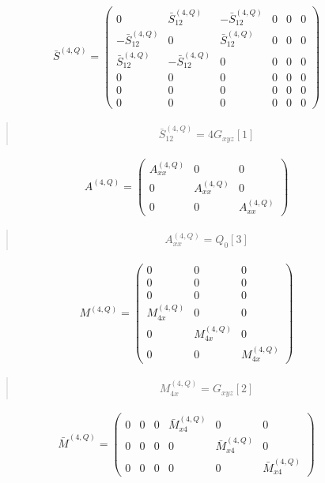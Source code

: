 \documentclass[fleqn,10pt]{jsarticle}
\begin{document}
\begin{align*}
\bar{S}^{(4,Q)} = \begin{pmatrix} 0 & \bar{S}^{(4,Q)}_{12} & - \bar{S}^{(4,Q)}_{12} & 0 & 0 & 0 \\ - \bar{S}^{(4,Q)}_{12} & 0 & \bar{S}^{(4,Q)}_{12} & 0 & 0 & 0 \\ \bar{S}^{(4,Q)}_{12} & - \bar{S}^{(4,Q)}_{12} & 0 & 0 & 0 & 0 \\ 0 & 0 & 0 & 0 & 0 & 0 \\ 0 & 0 & 0 & 0 & 0 & 0 \\ 0 & 0 & 0 & 0 & 0 & 0 \end{pmatrix}
\end{align*}
\begin{quote}
\begin{align*}
& \bar{S}^{(4,Q)}_{12} = 4 G_{xyz}[1]
\end{align*}
\end{quote}
\begin{align*}
A^{(4,Q)} = \begin{pmatrix} A^{(4,Q)}_{xx} & 0 & 0 \\ 0 & A^{(4,Q)}_{xx} & 0 \\ 0 & 0 & A^{(4,Q)}_{xx} \end{pmatrix}
\end{align*}
\begin{quote}
\begin{align*}
& A^{(4,Q)}_{xx} = Q_{0}[3]
\end{align*}
\end{quote}
\begin{align*}
M^{(4,Q)} = \begin{pmatrix} 0 & 0 & 0 \\ 0 & 0 & 0 \\ 0 & 0 & 0 \\ M^{(4,Q)}_{4x} & 0 & 0 \\ 0 & M^{(4,Q)}_{4x} & 0 \\ 0 & 0 & M^{(4,Q)}_{4x} \end{pmatrix}
\end{align*}
\begin{quote}
\begin{align*}
& M^{(4,Q)}_{4x} = G_{xyz}[2]
\end{align*}
\end{quote}
\begin{align*}
\bar{M}^{(4,Q)} = \begin{pmatrix} 0 & 0 & 0 & \bar{M}^{(4,Q)}_{x4} & 0 & 0 \\ 0 & 0 & 0 & 0 & \bar{M}^{(4,Q)}_{x4} & 0 \\ 0 & 0 & 0 & 0 & 0 & \bar{M}^{(4,Q)}_{x4} \end{pmatrix}
\end{align*}
\end{document}
